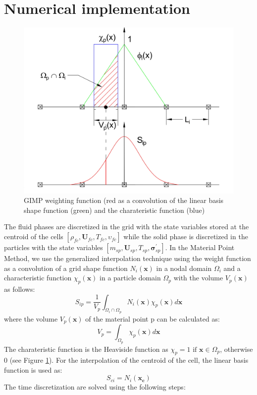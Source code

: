 \documentclass[preprint,12pt]{elsarticle}
\begin{document}
\section{\textsf{Numerical implementation}}
\label{Discretization}
%
%
\begin{figure}[H]
\center
\includegraphics[scale=.5]{GIMPshape.jpg}
\caption{GIMP weighting function (red as a convolution of the linear basis shape function (green) and the charateristic function (blue)}
\label{fig:GIMP}
\end {figure}
%
The fluid phases are discretized in the grid with the state variables stored at the centroid of the cells $[\rho_{fc},\pmb{U}_{fc},T_{fc},\upsilon_{fc}]$ while the solid phase is discretized in the particles with the state variables $[m_{sp},\pmb{U}_{sp},T_{sp},\pmb{\sigma}^\prime_{sp}]$. In the Material Point Method, we use the generalized interpolation technique \cite{GIMP} using the weight function as a convolution of a grid shape function $N_i(\pmb{x})$ in a nodal domain $\Omega_i$ and a characteristic function $\chi_p (\pmb{x})$ in a particle domain $\Omega_p$ with the volume $V_p (\pmb{x})$ as follows:
%
%
\begin{equation}
     S_{ip} = \frac{1}{V_p} \int_{\Omega_i \cap \Omega_p} N_i(\pmb{x}) \chi_p (\pmb{x}) d\pmb{x}
\end {equation}
%
%
where the volume $V_p (\pmb{x})$ of the material point p can be calculated as:
%
%
\begin{equation}
     V_{p} = \int_{\Omega_p} \chi_p (\pmb{x}) d\pmb{x}
\end {equation}
%
The charateristic function is the Heaviside function as $\chi_p = 1  \text{  if  } \pmb{x} \in \Omega_p$, otherwise 0 (see Figure \ref{fig:GIMP}). For the interpolation of the centroid of the cell, the linear basis function is used as:
%
\begin{equation}
     S_{ci}  = N_i(\pmb{x_c}) 
\end {equation}
%
The time discretization are solved using the following steps:
%
%
\end{document}
